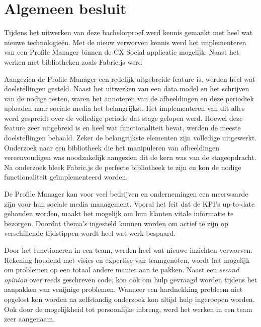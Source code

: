 \chapter{Algemeen besluit}
\vspace{-3cm}

Tijdens het uitwerken van deze bachelorproef werd kennis gemaakt met heel wat nieuwe technologie\"{e}n. Met de nieuw verworven kennis werd het implementeren van een Profile Manager binnen de CX Social applicatie mogelijk. Naast het werken met bibliotheken zoals Fabric.js werd 

Aangezien de Profile Manager een redelijk uitgebreide feature is, werden heel wat doelstellingen gesteld. Naast het uitwerken van een data model en het schrijven van de nodige testen, waren het annoteren van de afbeeldingen en deze periodiek uploaden naar sociale media het belangrijkst. Het implementeren van dit alles werd gespreidt over de volledige periode dat stage gelopen werd. Hoewel deze feature zeer uitgebreid is en heel wat functionaliteit bevat, werden de meeste doelstellingen behaald. Zeker de belangrijkste elementen zijn volledige uitgewerkt. Onderzoek naar een bibliotheek die het manipuleren van afbeeldingen vereenvoudigen was noodzakelijk aangezien dit de kern was van de stageopdracht. Na onderzoek bleek Fabric.js de perfecte bibliotheek te zijn en kon de nodige functionaliteit ge\"{i}mplementeerd worden.

De Profile Manager kan voor veel bedrijven en ondernemingen een meerwaarde zijn voor hun sociale media management. Vooral het feit dat de KPI's up-to-date gehouden worden, maakt het mogelijk om hun klanten vitale informatie te bezorgen. Doordat thema's ingesteld kunnen worden om actief te zijn op verschillende tijdstippen wordt heel wat werk bespaard. 

Door het functioneren in een team, werden heel wat nieuwe inzichten verworven. Rekening houdend met visies en expertise van teamgenoten, wordt het mogelijk om problemen op een totaal andere manier aan te pakken. Naast een \textit{second opinion} over reeds geschreven code, kon ook om hulp gevraagd worden tijdens het aanpakken van venijnige problemen. Wanneer een hardnekking probleem niet opgelost kon worden na zelfstandig onderzoek kon altijd hulp ingeroepen worden. Ook door de mogelijkheid tot persoonlijke inbreng, werd het werken in een team zeer aangenaam. 

